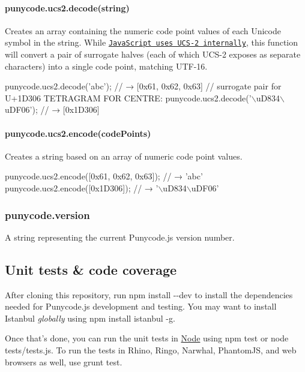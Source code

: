 \paragraph*{{\ttfamily punycode.\+ucs2.\+decode(string)}}

Creates an array containing the numeric code point values of each Unicode symbol in the string. While \href{https://mathiasbynens.be/notes/javascript-encoding}{\tt Java\+Script uses U\+C\+S-\/2 internally}, this function will convert a pair of surrogate halves (each of which U\+C\+S-\/2 exposes as separate characters) into a single code point, matching U\+T\+F-\/16.


\begin{DoxyCode}
punycode.ucs2.decode('abc');
// → [0x61, 0x62, 0x63]
// surrogate pair for U+1D306 TETRAGRAM FOR CENTRE:
punycode.ucs2.decode('\(\backslash\)uD834\(\backslash\)uDF06');
// → [0x1D306]
\end{DoxyCode}


\paragraph*{{\ttfamily punycode.\+ucs2.\+encode(code\+Points)}}

Creates a string based on an array of numeric code point values.


\begin{DoxyCode}
punycode.ucs2.encode([0x61, 0x62, 0x63]);
// → 'abc'
punycode.ucs2.encode([0x1D306]);
// → '\(\backslash\)uD834\(\backslash\)uDF06'
\end{DoxyCode}


\subsubsection*{{\ttfamily punycode.\+version}}

A string representing the current Punycode.\+js version number.

\subsection*{Unit tests \& code coverage}

After cloning this repository, run {\ttfamily npm install -\/-\/dev} to install the dependencies needed for Punycode.\+js development and testing. You may want to install Istanbul {\itshape globally} using {\ttfamily npm install istanbul -\/g}.

Once that’s done, you can run the unit tests in \mbox{\hyperlink{classNode}{Node}} using {\ttfamily npm test} or {\ttfamily node tests/tests.\+js}. To run the tests in Rhino, Ringo, Narwhal, Phantom\+JS, and web browsers as well, use {\ttfamily grunt test}.


